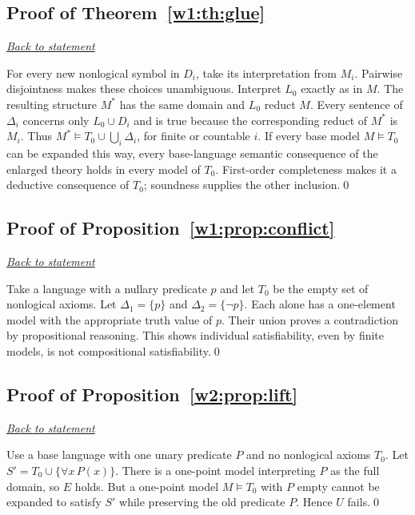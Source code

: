 \documentclass[11pt,letterpaper]{article}
\theoremstyle{definition}\newtheorem{definition}[theorem]{Definition}\newtheorem{example}[theorem]{Example}
\theoremstyle{remark}\newtheorem{remark}[theorem]{Remark}
\newcommand{\backlink}[1]{\noindent\hyperref[#1]{\textit{Back to statement}}\par\smallskip}
\begin{document}
\subsection{Proof of Theorem~\ref{w1:th:glue}}\label{w1:pr:glue}\backlink{w1:th:glue}
For every new nonlogical symbol in $D_i$, take its interpretation from $M_i$. Pairwise disjointness makes these choices unambiguous. Interpret $L_0$ exactly as in $M$. The resulting structure $M^*$ has the same domain and $L_0$ reduct $M$. Every sentence of $\Delta_i$ concerns only $L_0\cup D_i$ and is true because the corresponding reduct of $M^*$ is $M_i$. Thus $M^*\models T_0\cup\bigcup_i\Delta_i$, for finite or countable $i$. If every base model $M\models T_0$ can be expanded this way, every base-language semantic consequence of the enlarged theory holds in every model of $T_0$. First-order completeness makes it a deductive consequence of $T_0$; soundness supplies the other inclusion.\qed

\subsection{Proof of Proposition~\ref{w1:prop:conflict}}\label{w1:pr:conflict}\backlink{w1:prop:conflict}
Take a language with a nullary predicate $p$ and let $T_0$ be the empty set of nonlogical axioms. Let $\Delta_1=\{p\}$ and $\Delta_2=\{\neg p\}$. Each alone has a one-element model with the appropriate truth value of $p$. Their union proves a contradiction by propositional reasoning. This shows individual satisfiability, even by finite models, is not compositional satisfiability.\qed

\subsection{Proof of Proposition~\ref{w2:prop:lift}}\label{w2:pr:lift}\backlink{w2:prop:lift}
Use a base language with one unary predicate $P$ and no nonlogical axioms $T_0$. Let $S'=T_0\cup\{\forall x\,P(x)\}$. There is a one-point model interpreting $P$ as the full domain, so $E$ holds. But a one-point model $M\models T_0$ with $P$ empty cannot be expanded to satisfy $S'$ while preserving the old predicate $P$. Hence $U$ fails.\qed
\end{document}
